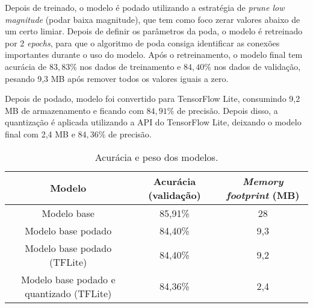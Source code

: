 Depois de treinado, o modelo é podado utilizando a estratégia de \textit{prune low magnitude} (podar baixa magnitude),
que tem como foco zerar valores abaixo de um certo limiar. Depois de definir os parâmetros da poda, o modelo é
retreinado por 2 \textit{epochs}, para que o algoritmo de poda consiga identificar as conexões importantes durante o
uso do modelo. Após o retreinamento, o modelo final tem acurácia de $83,83\%$ nos dados de treinamento e $84,40\%$
nos dados de validação, pesando 9,3 MB após remover todos os valores iguais a zero.

Depois de podado, modelo foi convertido para TensorFlow Lite, consumindo 9,2 MB de armazenamento e ficando com
$84,91\%$ de precisão. Depois disso, a quantização é aplicada utilizando a API do TensorFlow Lite, deixando o modelo
final com 2,4 MB e $84,36\%$ de precisão.

\begin{center}
\begin{table}[htb]
\centering
\ABNTEXfontereduzida
\caption[Acurácia e peso dos modelos]{Acurácia e peso dos modelos.}
\label{tabela_acuracia_peso}
\begin{tabular}{ |c|c|c| }
	\hline
	\textbf{Modelo} & \textbf{Acurácia (validação)}  & \textbf{\textit{Memory footprint} (MB)} \\
	\hline
	Modelo base 				 & 	85,91\% 	& 	28	\\
	Modelo base podado 			 & 	84,40\% 	& 	9,3	\\
	Modelo base podado (TFLite) 		 & 	84,40\% 	& 	9,2	\\
	Modelo base podado e quantizado (TFLite) & 	84,36\% 	& 	2,4	\\
	\hline
\end{tabular}
\end{table}
\end{center}
